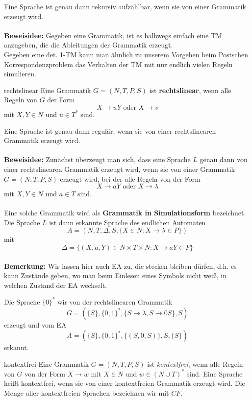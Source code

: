 \begin{satz}{}
Eine Sprache ist genau dann rekursiv aufzählbar, wenn sie von einer Grammatik erzeugt wird.\\
\\
\textbf{Beweisidee:}
Gegeben eine Grammatik, ist es halbwegs einfach eine TM anzugeben, die die Ableitungen der Grammatik erzeugt.\\
Gegeben eine det. 1-TM kann man ähnlich zu unserem Vorgehen beim Postschen Korrespondenzproblem das Verhalten der TM mit nur endlich vielen Regeln simulieren.
\end{satz}

\begin{defn}{rechtslinear}
Eine Grammatik $G = (N, T, P, S)$ ist \textbf{rechtslinear}, wenn alle Regeln von $G$ der Form
$$ X \to uY \text{ oder } X \to v $$
mit $X, Y \in N$ und $u \in T^*$ sind.
\end{defn}

\begin{satz}{}
Eine Sprache ist genau dann regulär, wenn sie von einer rechtslinearen Grammatik erzeugt wird.\\
\\
\textbf{Beweisidee:} Zunächst überzeugt man sich, dass eine Sprache $L$ genau dann von einer rechtslinearen Grammatik erzeugt wird, wenn sie von einer Grammatik $G = (N, T, P, S)$ erzeugt wird, bei der alle Regeln von der Form
$$ X \to aY \text{ oder } X \to \lambda $$
mit $X, Y \in N$ und $a \in T$ sind.\\
\\
Eine solche Grammatik wird als \textbf{Grammatik in Simulationsform} bezeichnet. Die Sprache $L$ ist dann erkannte Sprache des endlichen Automaten
$$ A = (N, T, \Delta, S, \{X \in N : X \to \lambda \in P \})$$
mit 
$$ \Delta = \{ (X, a, Y) \in N \times T \times N : X \to aY \in P \} $$
\\
\textbf{Bemerkung:} Wir lassen hier auch EA zu, die stecken bleiben dürfen, d.h. es kann Zustände geben, wo man beim Einlesen eines Symbols nicht weiß, in welchen Zustand der EA wechselt.
\end{satz}


\begin{exam}
Die Sprache $\{0\}^*$ wir von der rechtslinearen Grammatik
$$ G = (\{S\}, \{0, 1\}^*, \{S \to \lambda, S \to 0S\}, S) $$
erzeugt und vom EA
$$ A = (\{S\}, \{0, 1\}^*, \{(S, 0, S)\}, S, \{S\}) $$
erkannt.
\end{exam}

\begin{defn}{kontextfrei}
Eine Grammatik $G = (N, T, P, S)$ ist \textit{kontextfrei}, wenn alle Regeln von $G$ von der Form $ X \to w $ mit $X \in N$ und $w \in (N \cup T)^*$ sind. Eine Sprache heißt kontextfrei, wenn sie von einer kontextfreien Grammatik erzeugt wird. Die Menge aller kontextfreien Sprachen bezeichnen wir mit $CF$.
\end{defn}

